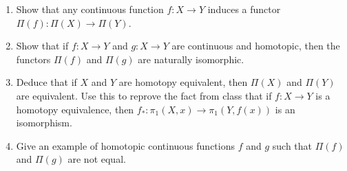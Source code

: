 \documentclass[12pt]{article}
\begin{document}
\begin{problem}{3}
\begin{enumerate}
    \item Show that any continuous function $f: X \to Y$ induces a functor $\Pi(f): \Pi(X) \to \Pi(Y)$.
 
    \item Show that if $f: X \to Y$ and $g: X \to Y$ are continuous and homotopic, then the functors $\Pi(f)$ and $\Pi(g)$ are naturally isomorphic. 

    \item Deduce that if $X$ and $Y$ are homotopy equivalent, then $\Pi(X)$ and $\Pi(Y)$ are equivalent. Use this to reprove the fact from class that if $f: X \to Y$ is a homotopy equivalence, then $f_*: \pi_1(X, x) \to \pi_1(Y,f(x))$ is an isomorphism.

    \item Give an example of homotopic continuous functions $f$ and $g$ such that $\Pi(f)$ and $\Pi(g)$ are not equal.
    \end{enumerate}
\end{problem}
\newpage
 
\end{document}
